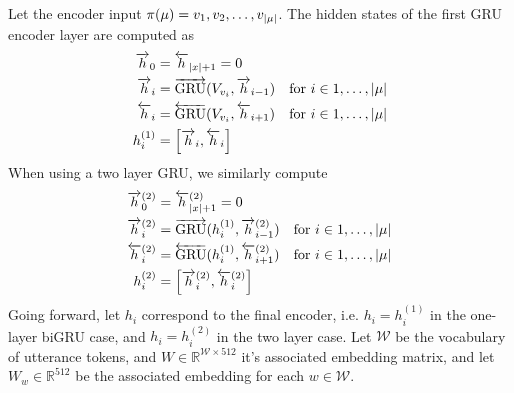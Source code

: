 Let the encoder input $\pi(\mu) = v_1, v_2, \ldots, v_{|\mu|}$.
The hidden states of the first GRU encoder layer are computed as
\begin{align*}
        \overrightarrow{h}_0 & =\overleftarrow{h}_{|x| + 1}  = 0 \\
        \overrightarrow{h}_i &= \overrightarrow{\operatorname{GRU}}(V_{v_i}, \overrightarrow{h}_{i-1}) &
        \textrm{for $i \in 1,\ldots,|\mu|$}\\
            \overleftarrow{h}_i &= \overleftarrow{\operatorname{GRU}}(V_{v_i}, \overleftarrow{h}_{i+1}) &
            \textrm{for $i \in 1,\ldots,|\mu|$}\\
                h_i^{(1)} & = \left[\overrightarrow{h}_i, \overleftarrow{h}_i\right]
        \end{align*} When using a two layer GRU, we similarly compute
        \begin{align*}
                \overrightarrow{h}^{(2)}_0 & =\overleftarrow{h}^{(2)}_{|x| + 1}  = 0 \\
                \overrightarrow{h}^{(2)}_i &= \overrightarrow{\operatorname{GRU}}(h^{(1)}_i, \overrightarrow{h}^{(2)}_{i-1}) &
                \textrm{for $i \in 1,\ldots,|\mu|$}\\
                    \overleftarrow{h}^{(2)}_i &= \overleftarrow{\operatorname{GRU}}(h^{(1)}_i, \overleftarrow{h}^{(2)}_{i+1}) &
                    \textrm{for $i \in 1,\ldots,|\mu|$}\\
                        h_i^{(2)} & = \left[\overrightarrow{h}^{(2)}_i, \overleftarrow{h}^{(2)}_i\right]
                \end{align*}
                Going forward, let $h_i$ correspond to the final encoder, i.e. $h_i = h_i^{(1)}$
                in the one-layer biGRU case, and $h_i=h_i^{(2)}$ in the two layer case.
                Let $\mathcal{W}$ be the vocabulary of utterance tokens, and $W\in\mathbb{R}^{
                \mathcal{W} \times 512}$ it's associated embedding matrix, and let
                $W_w \in \mathbb{R}^{512}$ be the associated embedding for
                each $w \in \mathcal{W}$.

